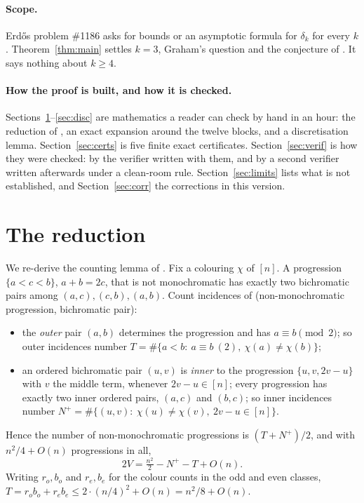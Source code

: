 \documentclass[11pt]{article}
\begin{document}
\paragraph{Scope.} Erd\H{o}s problem \#1186 asks for bounds or an asymptotic formula for $\delta_k$ for every $k$. Theorem~\ref{thm:main} settles $k=3$, Graham's question and the conjecture of \cite{PRS}. It says nothing about $k\ge4$.

\paragraph{How the proof is built, and how it is checked.} Sections~\ref{sec:red}--\ref{sec:disc} are mathematics a reader can check by hand in an hour: the reduction of \cite{PRS}, an exact expansion around the twelve blocks, and a discretisation lemma. Section~\ref{sec:certs} is five finite exact certificates. Section~\ref{sec:verif} is how they were checked: by the verifier written with them, and by a second verifier written afterwards under a clean-room rule. Section~\ref{sec:limits} lists what is not established, and Section~\ref{sec:corr} the corrections in this version.

\section{The reduction}\label{sec:red}

We re-derive the counting lemma of \cite{PRS}. Fix a colouring $\chi$ of $[n]$. A progression $\{a<c<b\}$, $a+b=2c$, that is not monochromatic has exactly two bichromatic pairs among $(a,c),(c,b),(a,b)$. Count incidences of (non-monochromatic progression, bichromatic pair):
\begin{itemize}
\item the \emph{outer} pair $(a,b)$ determines the progression and has $a\equiv b\pmod 2$; so outer incidences number $T=\#\{a<b:\ a\equiv b\ (2),\ \chi(a)\ne\chi(b)\}$;
\item an ordered bichromatic pair $(u,v)$ is \emph{inner} to the progression $\{u,v,2v-u\}$ with $v$ the middle term, whenever $2v-u\in[n]$; every progression has exactly two inner ordered pairs, $(a,c)$ and $(b,c)$; so inner incidences number $N^+=\#\{(u,v):\ \chi(u)\ne\chi(v),\ 2v-u\in[n]\}$.
\end{itemize}
Hence the number of non-monochromatic progressions is $(T+N^+)/2$, and with $n^2/4+O(n)$ progressions in all,
\[2V=\tfrac{n^2}{2}-N^+-T+O(n).\]
Writing $r_o,b_o$ and $r_e,b_e$ for the colour counts in the odd and even classes, $T=r_ob_o+r_eb_e\le2\cdot(n/4)^2+O(n)=n^2/8+O(n)$.
\end{document}
